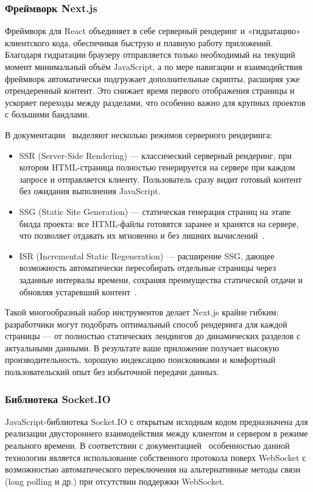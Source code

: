 \subsubsection*{Фреймворк Next.js}

Фреймворк для React объединяет в себе серверный рендеринг и «гидратацию» клиентского кода, обеспечивая быструю и плавную работу приложений. Благодаря гидратации браузеру отправляется только необходимый на текущий момент минимальный объём JavaScript, а по мере навигации и взаимодействия фреймворк автоматически подгружает дополнительные скрипты, расширяя уже отрендеренный контент. Это снижает время первого отображения страницы и ускоряет переходы между разделами, что особенно важно для крупных проектов с большими бандлами.

В документации~\cite{nextjs_ssr} выделяют несколько режимов серверного рендеринга:
\begin{itemize}
  \item SSR (Server-Side Rendering) — классический серверный рендеринг, при котором HTML-страница полностью генерируется на сервере при каждом запросе и отправляется клиенту. Пользователь сразу видит готовый контент без ожидания выполнения JavaScript.
  \item SSG (Static Site Generation) — статическая генерация страниц на этапе билда проекта: все HTML-файлы готовятся заранее и хранятся на сервере, что позволяет отдавать их мгновенно и без лишних вычислений~\cite{nextjs_ssg_isr}.
  \item ISR (Incremental Static Regeneration) — расширение SSG, дающее возможность автоматически пересобирать отдельные страницы через заданные интервалы времени, сохраняя преимущества статической отдачи и обновляя устаревший контент~\cite{nextjs_ssg_isr}.
\end{itemize}

Такой многообразный набор инструментов делает Next.js крайне гибким: разработчики могут подобрать оптимальный способ рендеринга для каждой страницы --- от полностью статических лендингов до динамических разделов с актуальными данными. В результате ваше приложение получает высокую производительность, хорошую индексацию поисковиками и комфортный пользовательский опыт без избыточной передачи данных.

\subsubsection*{Библиотека Socket.IO}

JavaScript-библиотека Socket.IO с открытым исходным кодом предназначена для реализации двустороннего взаимодействия между клиентом и сервером в режиме реального времени. В соответствии с документацией~\cite{socketio_docs} особенностью данной технологии является использование собственного протокола поверх WebSocket с возможностью автоматического переключения на альтернативные методы связи (long polling и др.) при отсутствии поддержки WebSocket.

